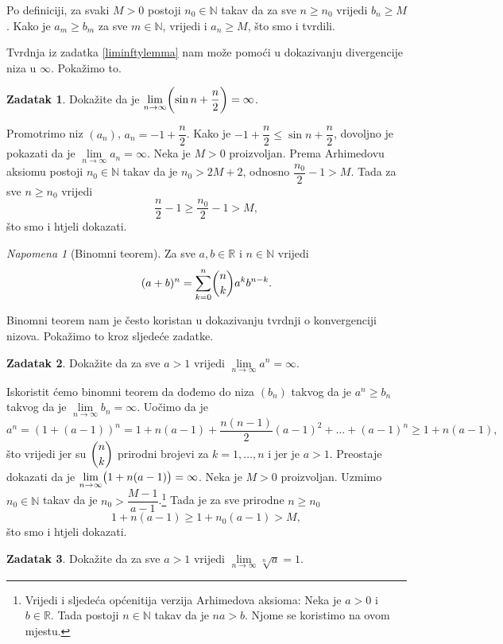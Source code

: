 \documentclass{book}
\let\originalleft\left
\let\originalright\right
\renewcommand{\left}{\mathopen{}\mathclose\bgroup\originalleft}
\renewcommand{\right}{\aftergroup\egroup\originalright}
\renewenvironment{proof}{%
    \vspace{-\parskip}\begin{oldproof}%
    }{%
    \end{oldproof}%
}
\theoremstyle{definition}
\theoremstyle{definition}
\newtheorem{exercise}{Zadatak}
\theoremstyle{remark}
\newtheorem{remark}{Napomena}
\begin{document}
\begin{proof}
Po definiciji, za svaki $M>0$ postoji $n_0\in \mathbb{N}$ takav da za sve $n\geq n_0$ vrijedi $b_n\geq M$. Kako je $a_m\geq b_m$ za sve $m\in \mathbb{N}$, vrijedi i $a_n\geq M$, što smo i tvrdili.
\end{proof}
Tvrdnja iz zadatka \ref{liminftylemma} nam može pomoći u dokazivanju divergencije niza u $\infty$. Pokažimo to.
\begin{exercise}
Dokažite da je $\lim\limits_{n\to \infty}\left(\sin{n}+\dfrac{n}{2}\right)=\infty$.
\end{exercise}
\begin{proof}[Rješenje]
Promotrimo niz $(a_n)$, $a_n=-1+\dfrac{n}{2}$. Kako je $-1+\dfrac{n}{2}\leq \sin{n}+\dfrac{n}{2}$, dovoljno je pokazati da je $\lim\limits_{n\to \infty}{a_n}=\infty$. Neka je $M>0$ proizvoljan. Prema Arhimedovu aksiomu postoji $n_0\in \mathbb{N}$ takav da je $n_0>2M+2$, odnosno $\dfrac{n_0}{2}-1>M$. Tada za sve $n\geq n_0$ vrijedi 
$$\dfrac{n}{2}-1\geq \dfrac{n_0}{2}-1>M,$$
što smo i htjeli dokazati.
\end{proof}
\begin{remark}[Binomni teorem]
Za sve $a, b\in \mathbb{R}$ i $n\in \mathbb{N}$ vrijedi
$$(a+b)^n=\dsum_{k=0}^n{\binom{n}{k}a^kb^{n-k}}.$$
\end{remark}
Binomni teorem nam je često koristan u dokazivanju tvrdnji o konvergenciji nizova. Pokažimo to kroz sljedeće zadatke.
\begin{exercise}
\label{liman}
Dokažite da za sve $a>1$ vrijedi $\lim\limits_{n\to \infty}{a^n}=\infty$.
\end{exercise}
\begin{proof}
Iskoristit ćemo binomni teorem da dođemo do niza $(b_n)$ takvog da je $a^n\geq b_n$ takvog da je $\lim\limits_{n\to \infty}{b_n}=\infty$. Uočimo da je
$$a^n=(1+(a-1))^n=1+n(a-1)+\dfrac{n(n-1)}{2}(a-1)^2+\dots+(a-1)^n\geq 1+n(a-1),$$
što vrijedi jer su $\dbinom{n}{k}$ prirodni brojevi za $k=1,\dots, n$ i jer je $a>1$. Preostaje dokazati da je $\lim\limits_{n\to \infty}\left(1+n\left(a-1\right)\right)=\infty$. Neka je $M>0$ proizvoljan. Uzmimo $n_0\in \mathbb{N}$ takav da je $n_0>\dfrac{M-1}{a-1}$.\footnote{Vrijedi i sljedeća općenitija verzija Arhimedova aksioma: Neka je $a>0$ i $b\in \mathbb{R}$. Tada postoji $n\in \mathbb{N}$ takav da je $na>b$. Njome se koristimo na ovom mjestu.} Tada je za sve prirodne $n\geq n_0$
$$1+n(a-1)\geq 1+n_0(a-1)>M,$$
što smo i htjeli dokazati.
\end{proof}
\begin{exercise}
Dokažite da za sve $a>1$ vrijedi $\lim\limits_{n\to \infty}{\sqrt[n]{a}}=1$.
\end{exercise}
\end{document}
